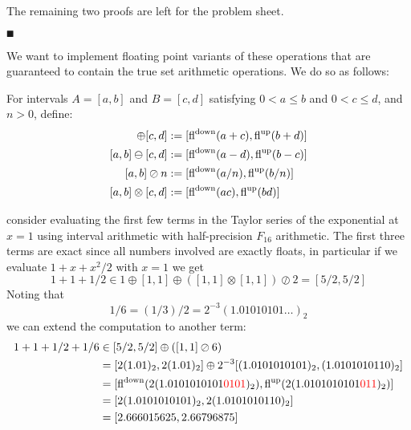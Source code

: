 The remaining two proofs are left for the problem sheet. 

\ensuremath{\QED}

We want to  implement floating point variants of these operations that are guaranteed to contain the true set arithmetic operations. We do so as follows:

\begin{definition} For intervals  $A = [a,b]$ and $B = [c,d]$ satisfying $0 < a \ensuremath{\leq} b$ and $0 < c \ensuremath{\leq} d$, and $n > 0$, define:
\begin{align*}
[a,b] \ensuremath{\oplus} [c,d] &:= [\fldown(a+c), \flup(b+d)] \\
[a,b] \ensuremath{\ominus} [c,d] &:= [\fldown(a-d), \flup(b-c)] \\
[a,b] \ensuremath{\oslash} n &:= [\fldown(a/n), \flup(b/n)] \\
[a,b] \ensuremath{\otimes} [c,d] &:= [\fldown(ac), \flup(bd)]
\end{align*}
\end{definition}

\begin{example} consider evaluating the first few terms in the Taylor series of the exponential at $x = 1$ using interval arithmetic with half-precision $F_{16}$ arithmetic.  The first three terms are exact since all numbers involved are exactly floats, in particular if we evaluate $1 + x + x^2/2$ with $x = 1$ we get
\[
1 + 1 + 1/2 \ensuremath{\in} 1 \ensuremath{\oplus} [1,1] \ensuremath{\oplus} ([1,1] \ensuremath{\otimes} [1,1]) \ensuremath{\oslash} 2 = [5/2, 5/2]
\]
Noting that 
\[
1/6 = (1/3)/2 = 2^{-3} (1.01010101\ensuremath{\ldots})_2
\]
we can extend the computation to another term:
\begin{align*}
1 + 1 + 1/2 + 1/6 &\ensuremath{\in} [5/2,5/2] \ensuremath{\oplus} ([1,1] \ensuremath{\oslash} 6) \ccr
= [2 (1.01)_2, 2 (1.01)_2] \ensuremath{\oplus} 2^{-3}[(1.0101010101)_2, (1.0101010110)_2] \ccr
= [\fldown(2 (1.0101010101\red{0101})_2), \flup(2 (1.0101010101\red{011})_2)] \ccr
= [2(1.0101010101)_2, 2(1.0101010110)_2] \ccr 
= [2.666015625, 2.66796875]
\end{align*}
\end{example}

